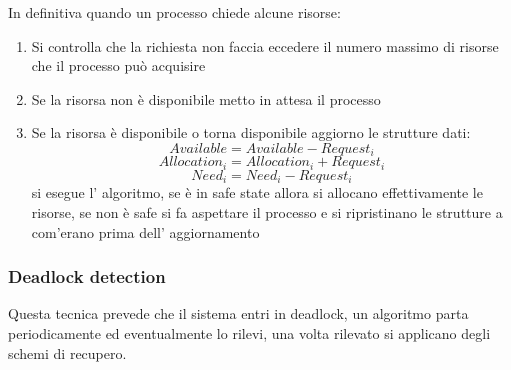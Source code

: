 In definitiva quando un processo chiede alcune risorse:
\begin{enumerate}
    \item Si controlla che la richiesta non faccia eccedere il numero massimo di risorse che il processo può acquisire
    \item Se la risorsa non è disponibile metto in attesa il processo
    \item Se la risorsa è disponibile o torna disponibile aggiorno le strutture dati:
    $$ Available = Available - Request_i $$
    $$ Allocation_i = Allocation_i + Request_i $$
    $$ Need_i = Need_i - Request_i $$
    si esegue l' algoritmo, se è in safe state allora si allocano effettivamente le risorse, se non è safe si fa aspettare il processo e si ripristinano le strutture a com'erano prima dell' aggiornamento
\end{enumerate}

\subsubsection{Deadlock detection}
Questa tecnica prevede che il sistema entri in deadlock, un algoritmo parta periodicamente ed eventualmente lo rilevi, una volta rilevato si applicano degli schemi di recupero.

